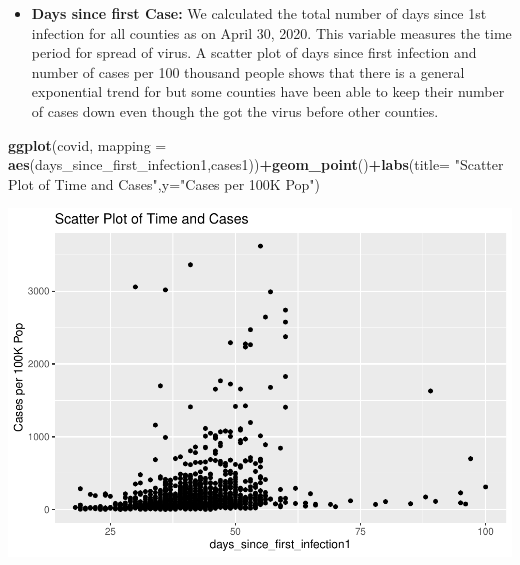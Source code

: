 \documentclass[
]{article}
\newenvironment{Shaded}{\begin{snugshade}}{\end{snugshade}}
\newcommand{\DataTypeTok}[1]{\textcolor[rgb]{0.13,0.29,0.53}{#1}}
\newcommand{\KeywordTok}[1]{\textcolor[rgb]{0.13,0.29,0.53}{\textbf{#1}}}
\newcommand{\NormalTok}[1]{#1}
\newcommand{\OperatorTok}[1]{\textcolor[rgb]{0.81,0.36,0.00}{\textbf{#1}}}
\newcommand{\StringTok}[1]{\textcolor[rgb]{0.31,0.60,0.02}{#1}}
\providecommand{\tightlist}{%
  \setlength{\itemsep}{0pt}\setlength{\parskip}{0pt}}
\begin{document}
\begin{itemize}
\tightlist
\item
  \textbf{Days since first Case:} We calculated the total number of days
  since 1st infection for all counties as on April 30, 2020. This
  variable measures the time period for spread of virus. A scatter plot
  of days since first infection and number of cases per 100 thousand
  people shows that there is a general exponential trend for but some
  counties have been able to keep their number of cases down even though
  the got the virus before other counties.
\end{itemize}

\begin{Shaded}
\begin{Highlighting}[]
\KeywordTok{ggplot}\NormalTok{(covid, }\DataTypeTok{mapping =} \KeywordTok{aes}\NormalTok{(days_since_first_infection1,cases1))}\OperatorTok{+}\KeywordTok{geom_point}\NormalTok{()}\OperatorTok{+}\KeywordTok{labs}\NormalTok{(}\DataTypeTok{title=} \StringTok{"Scatter Plot of Time and Cases"}\NormalTok{,}\DataTypeTok{y=}\StringTok{"Cases per 100K Pop"}\NormalTok{)}
\end{Highlighting}
\end{Shaded}

\includegraphics{covid_tree_analysis_files/figure-latex/unnamed-chunk-4-1.pdf}
\end{document}
